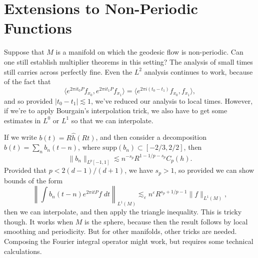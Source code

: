 \chapter{Extensions to Non-Periodic Functions}

Suppose that $M$ is a manifold on which the geodesic flow is non-periodic. Can one still establish multiplier theorems in this setting? The analysis of small times still carries across perfectly fine. Even the $L^2$ analysis continues to work, because of the fact that
%
\[ \langle e^{2 \pi i t_0 P} f_{x_0}, e^{2 \pi i t_1 P} f_{x_1} \rangle = \langle e^{2 \pi i (t_0 - t_1)} f_{x_0}, f_{x_1} \rangle, \]
%
and so provided $|t_0 - t_1| \lesssim 1$, we've reduced our analysis to local times. However, if we're to apply Bourgain's interpolation trick, we also have to get some estimates in $L^0$ or $L^1$ so that we can interpolate.

If we write $b(t) = R \widehat{h}(Rt)$, and then consider a decomposition $b(t) = \sum_n b_n(t - n)$, where $\text{supp}(b_n) \subset [-2/3,2/2]$, then
%
\[ \| b_n \|_{L^p[-1,1]} \lesssim n^{-s_p} R^{1 - 1/p - s_p} C_p(h). \]
%
Provided that $p < 2(d-1)/(d+1)$, we have $s_p > 1$, so provided we can show bounds of the form
%
\[ \left\| \int b_n( t - n ) e^{2 \pi i t P} f\; dt \right\|_{L^1(M)} \lesssim_\varepsilon n^\varepsilon R^{s_p + 1/p - 1} \| f \|_{L^1(M)}, \]
%
then we can interpolate, and then apply the triangle inequality. This is tricky though. It works when $M$ is the sphere, because then the result follows by local smoothing and periodicity. But for other manifolds, other tricks are needed. Composing the Fourier integral operator might work, but requires some technical calculations. 

